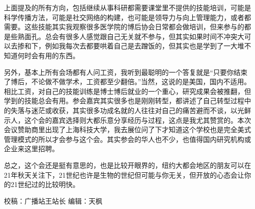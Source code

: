\documentclass[]{book}
\begin{document}
上面提及的所有方向，包括继续从事科研都需要课堂里不提供的技能培训，可能是科学传播方法，可能是社交网络的构建，也可能是领导力与向上管理能力，或者都需要。这些技能其实我观察很多医学院的博后协会日常都会做培训，但来参与的都是些熟面孔。总会有很多人感觉跟自己无关就不参与，但其实如果时间不冲突大可以去掺和下，例如我每次去都要哄着自己是去蹭饭的，但其实也是学到了一大堆不知道何时会有用的东西。

另外，基本上所有会场都有人问工资，我听到最聪明的一个答复就是``只要你结束了博后，不论做不做学术，工资都至少翻倍。''当然，这说的是美国，国内不适用。相比工资，对自己的技能训练是博士博后就业的一个重心，研究成果会被推翻，但学到的技能总会有用。参会嘉宾其实很多也是刚刚转型，都讲述了自己转型过程中的失落与迷茫或收获，其实很多功成名就的人往往对自己的痛苦避而不谈，以光鲜示人，这个会的嘉宾选择则大都乐意分享经历与过程，这点是我尤其赞赏的。本次会议赞助商里出现了上海科技大学，我去展位问了下才知道这个学校也是完全美式管理模式的所以才会参与这个会。其实参会的华人也不少，也值得国内研究机构或企业来这里招聘。

总之，这个会还是挺有意思的，也是比较开眼界的，纽约大都会地区的朋友可以在21年秋天关注下，21世纪也许是生物的世纪但可能与你无关，但开放的心态会让你的21世纪过的比较明快。

校稿：广播站王站长
编辑：天枫


\end{document}
